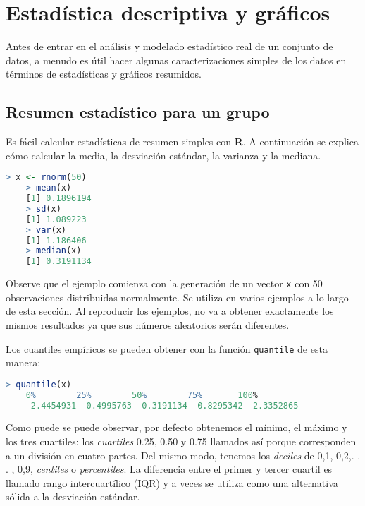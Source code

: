 \chapter{Estadística descriptiva y gráficos}

Antes de entrar en el análisis y modelado estadístico real de un conjunto de
datos, a menudo es útil hacer algunas caracterizaciones simples de los datos en
términos de estadísticas y gráficos resumidos.

\section{Resumen estadístico para un grupo} \label{resestad}

Es fácil calcular estadísticas de resumen simples con \textbf{R}. A continuación se
explica cómo calcular la media, la desviación estándar, la varianza y la
mediana.

\begin{lstlisting}[language=R]
    > x <- rnorm(50)
    > mean(x)
    [1] 0.1896194
    > sd(x)
    [1] 1.089223
    > var(x)
    [1] 1.186406
    > median(x)
    [1] 0.3191134
\end{lstlisting}

Observe que el ejemplo comienza con la generación de un vector \texttt{x} con 50
observaciones distribuidas normalmente. Se utiliza en varios ejemplos a lo largo
de esta sección. Al reproducir los ejemplos, no va a obtener exactamente los
mismos resultados ya que sus números aleatorios serán diferentes.

Los cuantiles empíricos se pueden obtener con la función \texttt{quantile} de
esta manera:

\begin{lstlisting}[language=R]
    > quantile(x)
    0%        25%        50%        75%       100%
    -2.4454931 -0.4995763  0.3191134  0.8295342  2.3352865
\end{lstlisting}

Como puede se puede observar, por defecto obtenemos el mínimo, el máximo y los
tres cuartiles: los \textit{cuartiles} 0.25, 0.50 y 0.75 llamados así porque
corresponden a un división en cuatro partes. Del mismo modo, tenemos los
\textit{deciles} de 0,1, 0,2,. . . , 0,9, \textit{centiles} o
\textit{percentiles}. La diferencia entre el primer y tercer cuartil es llamado
rango intercuartílico (IQR) y a veces se utiliza como una alternativa sólida a
la desviación estándar.

